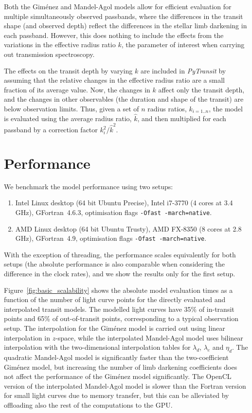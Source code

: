 \documentclass[usenatbib,usegraphicx,useAMS]{mn2e}
\newcommand{\gimenez}{Gim\'enez\xspace}
\newcommand{\pytransit}{\textit{PyTransit}\xspace}
\begin{document}
{Both the \gimenez and Mandel-Agol models allow for efficient evaluation for multiple simultaneously observed passbands, 
where the differences in the transit shape (and observed depth) reflect the differences in the stellar limb darkening in 
each passband. However, this does nothing to include the effects from the variations in the effective radius ratio $k$, 
the parameter of interest when carrying out transmission spectroscopy. 

The effects on the transit depth by varying $k$ are included in \pytransit by assuming that the relative changes in the 
effective radius ratio are a small fraction of its average value. Now, the changes in $k$ affect only the transit depth, 
and the changes in other observables (the duration and shape of the transit) are below observation limits. Thus, given a 
set of $n$ radius ratios, $k_{i=1..n}$, the model is evaluated using the average radius ratio, $\hat{k}$, and then 
multiplied for each passband by a correction factor $k_i^2/\hat{k}^2$. 

\section{Performance}
\label{sec:performance}

We benchmark the model performance using two setups: 
\begin{enumerate}
 \item Intel Linux desktop (64 bit Ubuntu Precise), Intel i7-3770 (4 cores at 3.4 GHz), GFortran~4.6.3, optimisation 
    flags \texttt{-Ofast -march=native}. 
 \item AMD Linux desktop (64 bit Ubuntu Trusty), AMD FX-8350 (8 cores at 2.8 GHz), 
    GFortran~4.9, optimisation flags \texttt{-Ofast -march=native}.
\end{enumerate}
With the exception of threading, the performance scales equivalently for both setups (the absolute performance is also 
comparable when considering the difference in the clock rates), and we show the results only for the first setup.

Figure~\ref{fig:basic_scalability} shows the absolute model evaluation times as a function of the number of light curve 
points for the directly evaluated and interpolated transit models. The modelled light curves have 35\% of in-transit 
points and 65\% of out-of-transit points, corresponding to a typical observation setup. The interpolation for the 
\gimenez model is carried out using linear interpolation in $z$-space, while the interpolated Mandel-Agol model uses 
bilinear interpolation with the two-dimensional interpolation tables for $\lambda_d$, $\lambda_e$ and $\eta_d$. The 
quadratic Mandel-Agol model is significantly faster than the two-coefficient \gimenez model, but increasing the number 
of limb darkening coefficients does not affect the performance of the \gimenez model significantly. The OpenCL version 
of the interpolated Mandel-Agol model is slower than the Fortran version for small light curves due to memory transfer, 
but this can be alleviated by offloading also the rest of the computations to the GPU.

}
\end{document}
